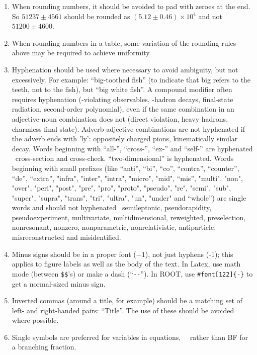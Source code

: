 \begin{enumerate}
\item When rounding numbers, it should be avoided to pad with zeroes
  at the end. So $51237 \pm 4561$ should be rounded as $(5.12 \pm 0.46)
  \times 10^4$ and not $51200 \pm 4600$.

\item When rounding numbers in a table, some variation of the rounding
  rules above may be required to achieve uniformity.

\item Hyphenation should be used where necessary to avoid ambiguity,
  but not excessively. For example: ``big-toothed fish'' (to indicate
  that big refers to the teeth, not to the fish), but ``big white
  fish''.  A compound modifier often requires hyphenation
  (\CP-violating observables, \bquark-hadron decays, final-state
  radiation, second-order polynomial), even if the same combination in
  an adjective-noun combination does not (direct \CP violation, heavy
  \bquark hadrons, charmless final state).  Adverb-adjective
  combinations are not hyphenated if the adverb ends with 'ly':
  oppositely charged pions, kinematically similar decay.  Words
  beginning with ``all-'', ``cross-'', ``ex-'' and ``self-'' are
  hyphenated \eg\ cross-section and cross-check. ``two-dimensional''
  is hyphenated. Words beginning with small prefixes (like ``anti'',
  ``bi'', ``co'', ``contra'', ``counter'', ``de'', ``extra'', "infra",
  "inter", "intra", "micro", "mid", ``mis'', "multi", "non", "over",
  "peri", "post", "pre", "pro", "proto", "pseudo", "re", "semi",
  "sub", "super", "supra", "trans", "tri", "ultra", "un", "under" and
  ``whole'') are single words and should not hyphenated
  \eg\ semileptonic, pseudorapidity, pseudoexperiment, multivariate,
  multidimensional, reweighted, preselection, nonresonant, nonzero,
  nonparametric, nonrelativistic, antiparticle,
  misreconstructed and misidentified.

\item Minus signs should be in a proper font ($-1$), not just hyphens
  (-1); this applies to figure labels as well as the body of the text.
  In Latex, use math mode (between \verb!$$!'s) or make a dash (``\verb!--!'').
  In ROOT, use \verb!#font[122]{-}! to get a normal-sized minus sign. 

\item Inverted commas (around a title, for example) should be a
  matching set of left- and right-handed pairs: ``Title''. The use of
  these should be avoided where possible.

\item Single symbols are preferred for variables in equations, \eg\
  \BF\ rather than BF for a branching fraction.


\end{enumerate}
